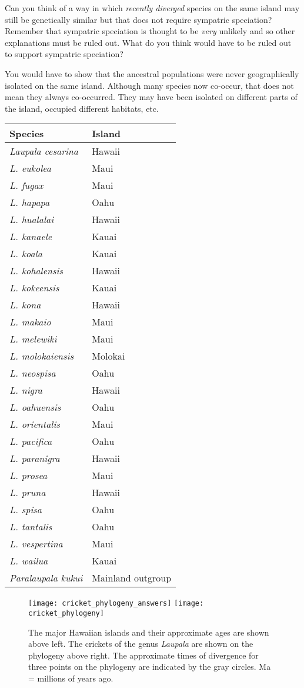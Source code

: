 \documentclass[11pt, addpoints]{exam}
\begin{document}
\begin{questions}
\question[3]
Can you think of a way in which \emph{recently diverged} species on
the same island may still be genetically similar but that does not
require sympatric speciation? Remember that sympatric speciation is
thought to be \emph{very} unlikely and so other explanations must be
ruled out. What do you think would have to be ruled out to support
sympatric speciation?

\begin{minipage}[t][1.3in]{\textwidth}%
\begin{solution}
You would have to show that the ancestral populations were never geographically isolated on the same island. Although many species now co-occur, that does not mean they always co-occurred. They may have been isolated on different parts of the island, occupied different habitats, etc.
\end{solution}
\end{minipage}

\end{questions}

\newpage

\begin{longtable}[c]{@{}ll@{}}
\toprule
\textbf{Species} & \textbf{Island}\tabularnewline
\midrule
\endhead
\emph{Laupala cesarina} & Hawaii\tabularnewline
\emph{L. eukolea} & Maui\tabularnewline
\emph{L. fugax} & Maui\tabularnewline
\emph{L. hapapa} & Oahu\tabularnewline
\emph{L. hualalai} & Hawaii\tabularnewline
\emph{L. kanaele} & Kauai\tabularnewline
\emph{L. koala} & Kauai\tabularnewline
\emph{L. kohalensis} & Hawaii\tabularnewline
\emph{L. kokeensis} & Kauai\tabularnewline
\emph{L. kona} & Hawaii\tabularnewline
\emph{L. makaio} & Maui\tabularnewline
\emph{L. melewiki} & Maui\tabularnewline
\emph{L. molokaiensis} & Molokai\tabularnewline
\emph{L. neospisa} & Oahu\tabularnewline
\emph{L. nigra} & Hawaii\tabularnewline
\emph{L. oahuensis} & Oahu\tabularnewline
\emph{L. orientalis} & Maui\tabularnewline
\emph{L. pacifica} & Oahu\tabularnewline
\emph{L. paranigra} & Hawaii\tabularnewline
\emph{L. prosea} & Maui\tabularnewline
\emph{L. pruna} & Hawaii\tabularnewline
\emph{L. spisa} & Oahu\tabularnewline
\emph{L. tantalis} & Oahu\tabularnewline
\emph{L. vespertina} & Maui\tabularnewline
\emph{L. wailua} & Kauai\tabularnewline
\emph{Paralaupala kukui} & Mainland outgroup\tabularnewline
\bottomrule
\end{longtable}\label{tab:cricket_table}

\newpage

\begin{figure}[h!]

	\ifprintanswers
		\texttt{[image: cricket\_phylogeny\_answers]}
	\else
		\texttt{[image: cricket\_phylogeny]}
	\fi
\vspace{\baselineskip}

The major Hawaiian islands and their approximate ages are shown above left. The crickets of the genus \textit{Laupala} are shown on the phylogeny  above right. The approximate times of divergence for three points on the phylogeny are indicated by the gray circles. Ma = millions of years ago.

\end{figure}\label{fig:cricket_phylogeny}
\end{document}

